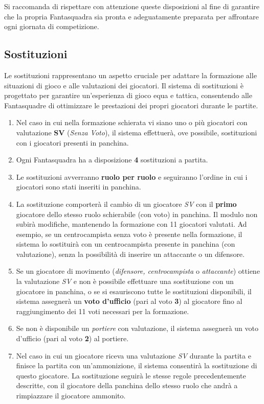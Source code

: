 \documentclass[12pt]{article}
\begin{document}
Si raccomanda di rispettare con attenzione queste disposizioni al fine di garantire che la propria Fantasquadra sia pronta e adeguatamente preparata per affrontare ogni giornata di competizione.

\subsection{Sostituzioni}

Le sostituzioni rappresentano un aspetto cruciale per adattare la formazione alle situazioni di gioco e alle valutazioni dei giocatori. Il sistema di sostituzioni è progettato per garantire un'esperienza di gioco equa e tattica, consentendo alle Fantasquadre di ottimizzare le prestazioni dei propri giocatori durante le partite.

\begin{enumerate}
    \item Nel caso in cui nella formazione schierata vi siano uno o più giocatori con valutazione \textbf{SV} (\textit{Senza Voto}), il sistema effettuerà, ove possibile, sostituzioni con i giocatori presenti in panchina.
    \item Ogni Fantasquadra ha a disposizione \textbf{4} sostituzioni a partita.
    \item Le sostituzioni avverranno \textbf{ruolo per ruolo} e seguiranno l'ordine in cui i giocatori sono stati inseriti in panchina.
    \item La sostituzione comporterà il cambio di un giocatore \textit{SV} con il \textbf{primo} giocatore dello stesso ruolo schierabile (con voto) in panchina. Il modulo non subirà modifiche, mantenendo la formazione con 11 giocatori valutati. Ad esempio, se un centrocampista senza voto è presente nella formazione, il sistema lo sostituirà con un centrocampista presente in panchina (con valutazione), senza la possibilità di inserire un attaccante o un difensore.
    \item Se un giocatore di movimento (\textit{difensore, centrocampista} o \textit{attaccante}) ottiene la valutazione \textit{SV} e non è possibile effettuare una sostituzione con un giocatore in panchina, o se si esauriscono tutte le sostituzioni disponibili, il sistema assegnerà un \textbf{voto d'ufficio} (pari al voto \textbf{3}) al giocatore fino al raggiungimento dei 11 voti necessari per la formazione.
    \item Se non è disponibile un \textit{portiere} con valutazione, il sistema assegnerà un voto d'ufficio (pari al voto \textbf{2}) al portiere.
    \item Nel caso in cui un giocatore riceva una valutazione \textit{SV} durante la partita e finisce la partita con un'ammonizione, il sistema consentirà la sostituzione di questo giocatore. La sostituzione seguirà le stesse regole precedentemente descritte, con il giocatore della panchina dello stesso ruolo che andrà a rimpiazzare il giocatore ammonito.
\end{enumerate}
\end{document}
